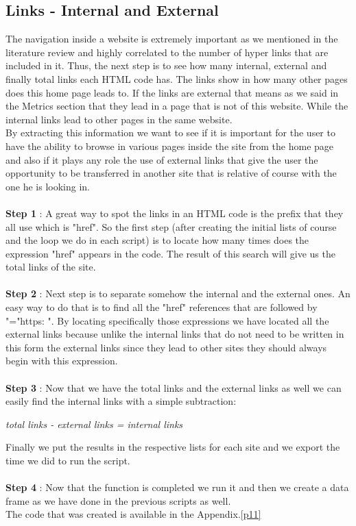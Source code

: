 \documentclass{book}
\begin{document}
\subsection{Links - Internal and External}
The navigation inside a website is extremely important as we mentioned in the literature review and highly correlated to the number of hyper links that are included in it. Thus, the next step is to see how many internal, external and finally total links each HTML code has. The links show in how many other pages does this home page leads to. If the links are external that means as we said in the Metrics section that they lead in a page that is not of this website. While the internal links lead to other pages in the same website.\\
By extracting this information we want to see if it is important for the user to have the ability to browse in various pages inside the site from the home page and also if it plays any role the use of external links that give the user the opportunity to be transferred in another site that is relative of course with the one he is looking in.\\\\
\textbf{Step 1} : A great way to spot the links in an HTML code is the prefix that they all use which is "href". So the first step (after creating the initial lists of course and the loop we do in each script) is to locate how many times does the expression "href" appears in the code. The result of this search will give us the total links of the site.\\\\
\textbf{Step 2} : Next step is to separate somehow the internal and the external ones. An easy way to do that is to find all the "href" references that are followed by "="https: ". By locating specifically those expressions we have located all the external links because unlike the internal links that do not need to be written in this form the external links since they lead to other sites they should always begin with this expression.\\\\
\textbf{Step 3} : Now that we have the total links and the external links as well we can easily find the internal links with a simple subtraction:
\begin{center}
\textit{total links - external links = internal links}
\end{center}
Finally we put the results in the respective lists for each site and we export the time we did to run the script.\\\\
\textbf{Step 4} : Now that the function is completed we run it and then we create a data frame as we have done in the previous scripts as well.\\
The code that was created is available in the Appendix.\ref{p11}
\end{document}
